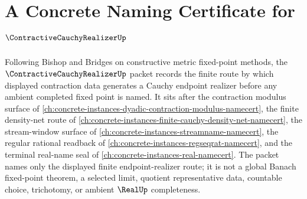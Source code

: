 \chapter{A Concrete Naming Certificate for $\ContractiveCauchyRealizerUp$}
\label{ch:concrete-instances-contractive-cauchy-realizer-namecert}

Following Bishop and Bridges on constructive metric fixed-point methods, the $\ContractiveCauchyRealizerUp$ packet records the finite route by which displayed contraction data generates a Cauchy endpoint realizer before any ambient completed fixed point is named. It sits after the contraction modulus surface of \autoref{ch:concrete-instances-dyadic-contraction-modulus-namecert}, the finite density-net route of \autoref{ch:concrete-instances-finite-cauchy-density-net-namecert}, the stream-window surface of \autoref{ch:concrete-instances-streamname-namecert}, the regular rational readback of \autoref{ch:concrete-instances-regseqrat-namecert}, and the terminal real-name seal of \autoref{ch:concrete-instances-real-namecert}. The packet names only the displayed finite endpoint-realizer route; it is not a global Banach fixed-point theorem, a selected limit, quotient representative data, countable choice, trichotomy, or ambient $\RealUp$ completeness.

